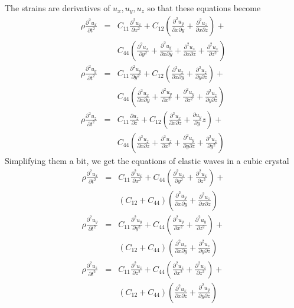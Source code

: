 \documentclass{article}
\newcommand{\pdt}[2]{\frac{\partial{#1}}{\partial{#2}}}
\newcommand{\spdt}[2]{\frac{\partial^2{#1}}{\partial{#2}^2}}
\newcommand{\spdtm}[3]{\frac{\partial^2{#1}}{\partial{#2}\partial{#3}}}
\begin{document}
The strains are derivatives of $u_x, u_y, u_z$ so that these equations become
\begin{eqnarray*}
\rho\spdt{u_x}{t} &=& C_{11}\spdt{u_x}{x} + C_{12}\left(\spdtm{u_y}{x}{y} +
\spdtm{u_z}{x}{z}\right) + \\
& & C_{44}\left(\spdt{u_x}{y} + \spdtm{u_y}{x}{y} + 
\spdtm{u_x}{x}{z} + \spdt{u_x}{z}\right) \\
\rho\spdt{u_y}{t} &=& C_{11}\spdt{u_y}{y} + C_{12}\left(\spdtm{u_x}{x}{y} +
\spdtm{u_z}{y}{z}\right) + \\
 & & C_{44}\left(\spdtm{u_x}{x}{y} + \spdt{u_y}{x} + \spdt{u_y}{z}
+ \spdtm{u_z}{y}{z}\right) \\
\rho\spdt{u_z}{t} &=& C_{11}\pdt{u_z}{z} + C_{12}\left(\spdtm{u_x}{x}{z} +
\pdt{u_y}{y}{z}\right) + \\
& & C_{44}\left(\spdtm{u_z}{x}{z} + \spdt{u_z}{x} + \spdtm{u_y}{y}{z}
+ \spdt{u_z}{y}\right)
\end{eqnarray*}
Simplifying them a bit, we get the equations of elastic waves in a cubic crystal
\begin{eqnarray}
\rho\spdt{u_x}{t} &=& C_{11}\spdt{u_x}{x} +C_{44}\left(\spdt{u_x}{y} + 
\spdt{u_x}{z}\right) + \nonumber \\
& & (C_{12} + C_{44})\left(\spdtm{u_y}{x}{y} + \spdtm{u_z}{x}{z}\right)
\label{e18} \\
\rho\spdt{u_y}{t} &=& C_{11}\spdt{u_y}{y} + C_{44}\left(\spdt{u_y}{x} + 
\spdt{u_y}{z}\right) + \nonumber \\
& & (C_{12} + C_{44})\left(\spdtm{u_x}{x}{y} + \spdtm{u_z}{y}{z}\right)
\label{e19} \\
\rho\spdt{u_z}{t} &=& C_{11}\spdt{u_z}{z} + C_{44}\left(\spdt{u_z}{x} + 
\spdt{u_z}{z}\right) + \nonumber \\
& & (C_{12} + C_{44})\left(\spdtm{u_x}{x}{z} + \spdtm{u_y}{y}{z}\right)
\label{e20}
\end{eqnarray}
\end{document}
